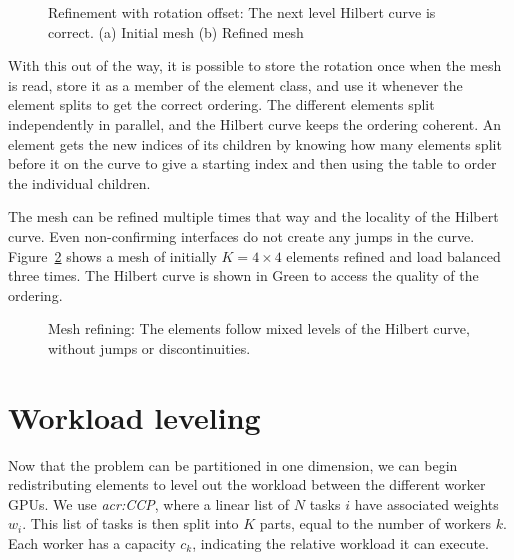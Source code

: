 \begin{figure}[H]
	\centering
	\hfill
	\caption{Refinement with rotation offset: The next level Hilbert curve is correct. (a) Initial mesh (b) Refined mesh}
	\label{fig:hilbert_correct}
\end{figure}

With this out of the way, it is possible to store the rotation once when the mesh is read, store it
as a member of the element class, and use it whenever the element splits to get the correct
ordering. The different elements split independently in parallel, and the Hilbert curve keeps the
ordering coherent. An element gets the new indices of its children by knowing how many elements
split before it on the curve to give a starting index and then using the table to order the
individual children.

The mesh can be refined multiple times that way and the locality of the Hilbert curve. Even
non-confirming interfaces do not create any jumps in the curve. Figure~\ref{fig:mesh_1_after2} shows
a mesh of initially $K = 4 \times 4$ elements refined and load balanced three times. The Hilbert curve is
shown in Green to access the quality of the ordering.

\begin{figure}[H]
	\centering
	
	\caption{Mesh refining: The elements follow mixed levels of the Hilbert curve, without jumps or discontinuities.}
	\label{fig:mesh_1_after2}
\end{figure}

\section{Workload leveling} \label{section:load_balancing:workload_leveling}

Now that the problem can be partitioned in one dimension, we can begin redistributing elements to
level out the workload between the different worker GPUs. We use \textit{\acrfull{acr:CCP}}, where a
linear list of $N$ tasks $i$ have associated weights $w_i$. This list of tasks is then split into
$K$ parts, equal to the number of workers $k$. Each worker has a capacity $c_k$, indicating the
relative workload it can execute.

